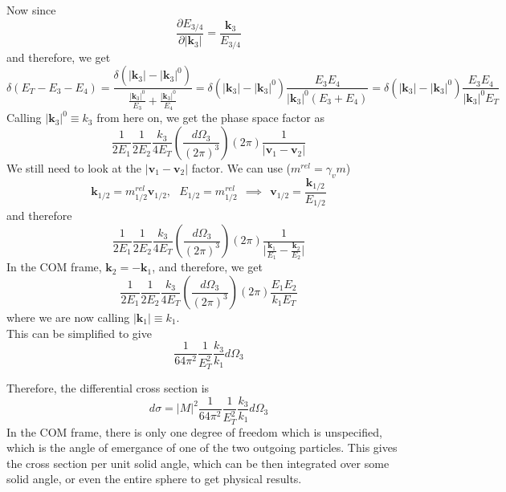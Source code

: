 \documentclass[11pt]{article}
\newcommand{\del}{\partial}
\numberwithin{equation}{section}
\begin{document}
Now since
\begin{equation*}
    \frac{\del E_{3/4}}{\del |\textbf{k}_3|} = \frac{\textbf{k}_3}{E_{3/4}}
\end{equation*}
and therefore, we get 
\begin{equation*}
    \delta(E_T - E_3 - E_4) = \frac{\delta\left(|\textbf{k}_3| - |\textbf{k}_3|^0\right)}{\displaystyle \frac{|\textbf{k}_3|^0}{E_3} + \frac{|\textbf{k}_3|^0}{E_4}} = \delta\left(|\textbf{k}_3| - |\textbf{k}_3|^0\right) \frac{E_3E_4}{|\textbf{k}_3|^0(E_3+E_4)} = \delta\left(|\textbf{k}_3| - |\textbf{k}_3|^0\right) \frac{E_3E_4}{|\textbf{k}_3|^0 E_T}
\end{equation*}
Calling \(|\textbf{k}_3|^0 \equiv k_3\) from here on, we get the phase space factor as
\begin{equation*}
    \frac{1}{2E_1}\frac{1}{2E_2}\frac{k_3}{4 E_T}\left(\frac{d\Omega_3}{(2\pi)^3}\right)(2\pi)\frac{1}{|\textbf{v}_1 - \textbf{v}_2|}
\end{equation*}
We still need to look at the \(|\textbf{v}_1 - \textbf{v}_2|\) factor. We can use (\(m^{rel} = \gamma_v m\))
\begin{equation*}
    \textbf{k}_{1/2} = m_{1/2}^{rel} \textbf{v}_{1/2},~~~E_{1/2} = m_{1/2}^{rel}~~\implies~~\textbf{v}_{1/2} = \frac{\textbf{k}_{1/2}}{E_{1/2}}
\end{equation*}
and therefore
\begin{equation*}
    \frac{1}{2E_1}\frac{1}{2E_2}\frac{k_3}{4 E_T}\left(\frac{d\Omega_3}{(2\pi)^3}\right)(2\pi)\frac{1}{\displaystyle\bigg|\frac{\textbf{k}_1}{E_1} - \frac{\textbf{k}_2}{E_2}\bigg|}
\end{equation*}
In the COM frame, \(\textbf{k}_2 = -\textbf{k}_1\), and therefore, we get 
\begin{equation*}
    \frac{1}{2E_1}\frac{1}{2E_2}\frac{k_3}{4 E_T}\left(\frac{d\Omega_3}{(2\pi)^3}\right)(2\pi)\frac{E_1E_2}{k_1E_T}
\end{equation*}
where we are now calling \(|\textbf{k}_1| \equiv k_1\).\\
This can be simplified to give 
\begin{equation*}
    \frac{1}{64 \pi^2} \frac{1}{E_T^2} \frac{k_3}{k_1} d\Omega_3
\end{equation*}

Therefore, the differential cross section is 
\begin{equation*}
    d\sigma = |M|^2 \frac{1}{64 \pi^2} \frac{1}{E_T^2} \frac{k_3}{k_1} d\Omega_3
\end{equation*}
In the COM frame, there is only one degree of freedom which is unspecified, which is the angle of emergance of one of the two outgoing particles. This gives the cross section per unit solid angle, which can be then integrated over some solid angle, or even the entire sphere to get physical results.\\
\end{document}
